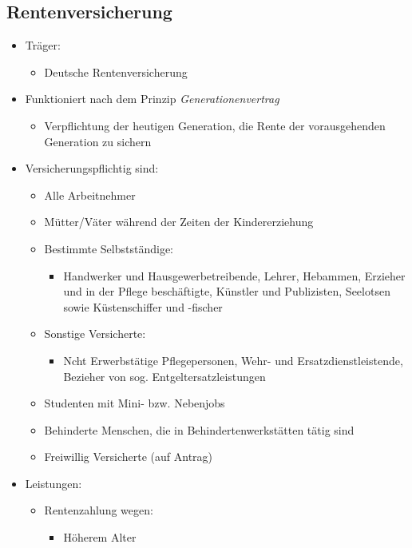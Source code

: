 \documentclass[a4paper, 12pt]{report}
\begin{document}
\newpage
\subsection{Rentenversicherung}

\begin{itemize}
    \item Träger:
	\begin{itemize}
	    \item Deutsche Rentenversicherung
	\end{itemize}
    \item Funktioniert nach dem Prinzip \emph{Generationenvertrag}
	\begin{itemize}
	    \item Verpflichtung der heutigen Generation, die Rente der
		vorausgehenden Generation zu sichern
	\end{itemize}
    \item Versicherungspflichtig sind:
	\begin{itemize}
	    \item Alle Arbeitnehmer
	    \item Mütter/Väter während der Zeiten der Kindererziehung
	    \item Bestimmte Selbstständige:
		\begin{itemize}
		    \item Handwerker und Hausgewerbetreibende, Lehrer, Hebammen,
			Erzieher und in der Pflege beschäftigte, Künstler und
			Publizisten, Seelotsen sowie Küstenschiffer und -fischer
		\end{itemize}
	    \item Sonstige Versicherte:
		\begin{itemize}
		    \item Ncht Erwerbstätige Pflegepersonen, Wehr- und
			Ersatzdienstleistende, Bezieher von sog.
			Entgeltersatzleistungen
		\end{itemize}
	    \item Studenten mit Mini- bzw. Nebenjobs
	    \item Behinderte Menschen, die in Behindertenwerkstätten tätig sind
	    \item Freiwillig Versicherte (auf Antrag)
	\end{itemize}
    \item Leistungen:
	\begin{itemize}
	    \item Rentenzahlung wegen:
		\begin{itemize}
		    \item Höherem Alter

\end{itemize}
\end{itemize}
\end{itemize}
\end{document}
